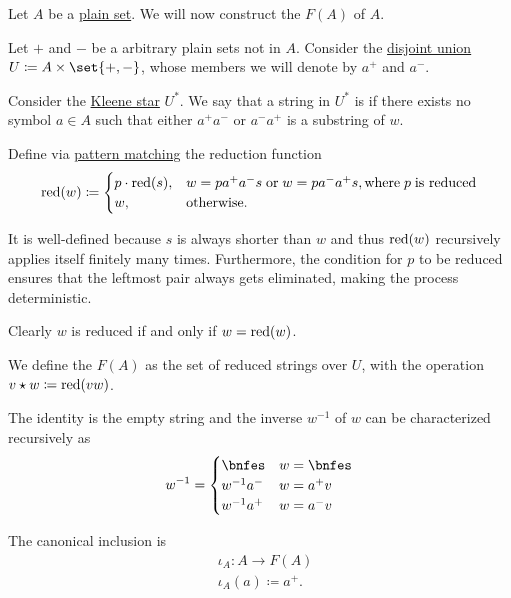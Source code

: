 \begin{definition}\label{def:free_group}\mimprovised
  Let \( A \) be a \hyperref[def:set]{plain set}. We will now construct the  \( F(A) \) of \( A \).

  Let \( + \) and \( - \) be a arbitrary plain sets not in \( A \). Consider the \hyperref[def:disjoint_union]{disjoint union} \( U \coloneqq A \times \set{ +, - } \), whose members we will denote by \( a^+ \) and \( a^- \).

  Consider the \hyperref[def:formal_language/kleene_star]{Kleene star} \( U^* \). We say that a string in \( U^* \) is  if there exists no symbol \( a \in A \) such that either \( a^+ a^- \) or \( a^- a^+ \) is a substring of \( w \).

  Define via \hyperref[con:evaluation]{pattern matching} the reduction function
  \begin{equation*}
    \red(w) \coloneqq \begin{cases}
      p \cdot \red(s), &w = p a^+ a^- s \T{or} w = p a^- a^+ s, \T{where} p \T{is reduced} \\
      w,               &\T{otherwise.}
    \end{cases}
  \end{equation*}

  It is well-defined because \( s \) is always shorter than \( w \) and thus \( \operatorname{red}(w) \) recursively applies itself finitely many times. Furthermore, the condition for \( p \) to be reduced ensures that the leftmost pair always gets eliminated, making the process deterministic.

  Clearly \( w \) is reduced if and only if \( w = \operatorname{red}(w) \).

  We define the  \( F(A) \) as the set of reduced strings over \( U \), with the operation \( v \star w \coloneqq \operatorname{red}(vw) \).

  The identity is the empty string and the inverse \( w^{-1} \) of \( w \) can be characterized recursively as
  \begin{equation*}
    w^{-1} = \begin{cases}
      \bnfes &w = \bnfes \\
      w^{-1} a^-  &w = a^+ v \\
      w^{-1} a^+  &w = a^- v
    \end{cases}
  \end{equation*}

  The canonical inclusion is
  \begin{equation*}
    \begin{aligned}
      &\iota_A: A \to F(A) \\
      &\iota_A(a) \coloneqq a^+.
    \end{aligned}
  \end{equation*}
\end{definition}
